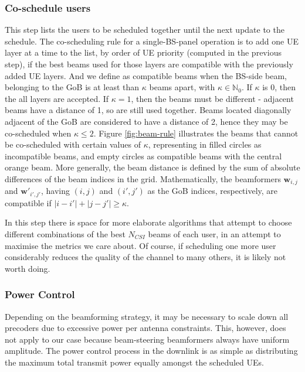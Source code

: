 \subsubsection*{Co-schedule users}
This step lists the users to be scheduled together until the next update to the schedule. The co-scheduling rule for a single-BS-panel operation is to add one UE layer at a time to the list, by order of \ac{UE} priority (computed in the previous step), if the best beams used for those layers are compatible with the previously added \ac{UE} layers. And we define as compatible beams when the BS-side beam, belonging to the \ac{GoB} is at least than $\kappa$ beams apart, with $\kappa \in \mathbb{N}_0$. If $\kappa$ is 0, then the all layers are accepted. If $\kappa = 1$, then the beams must be different - adjacent beams have a distance of 1, so are still used together. Beams located diagonally adjacent of the \ac{GoB} are considered to have a distance of 2, hence they may be co-scheduled when $\kappa \leq 2$. Figure \ref{fig:beam-rule} illustrates the beams that cannot be co-scheduled with certain values of $\kappa$, representing in filled circles as incompatible beams, and empty circles as compatible beams with the central orange beam. More generally, the beam distance is defined by the sum of absolute differences of the beam indices in the grid. Mathematically, the beamformers $\bm{w}_{i,j}$ and $\bm{w}'_{i',j'}$, having $(i,j)$ and $(i', j')$ as the GoB indices, respectively, are compatible if $|i-i'| + |j - j'| \geq \kappa$.
    

In this step there is space for more elaborate algorithms that attempt to choose different combinations of the best $N_{CSI}$ beams of each user, in an attempt to maximise the metrics we care about. Of course, if scheduling one more user considerably reduces the quality of the channel to many others, it is likely not worth doing.


\subsubsection*{Power Control}
Depending on the beamforming strategy, it may be necessary to scale down all precoders due to excessive power per antenna constraints. This, however, does not apply to our case because beam-steering beamformers always have uniform amplitude. The power control process in the downlink is as simple as distributing the maximum total transmit power equally amongst the scheduled UEs.
    
